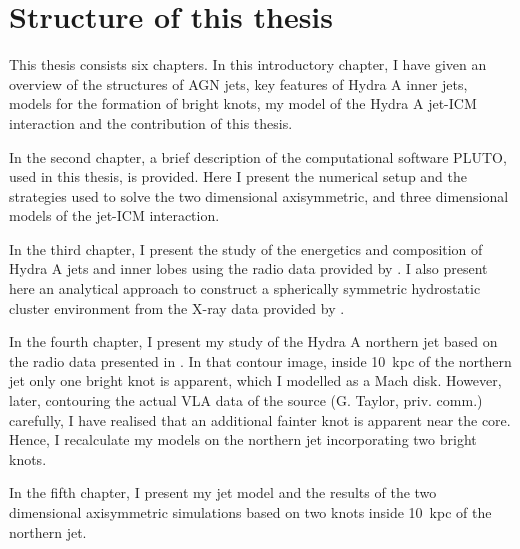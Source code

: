 %
%

\section{Structure of this thesis}
This thesis consists six chapters. In this introductory chapter, I have given an overview of the structures of AGN jets, key features of Hydra A inner jets, models for the formation of bright knots, my model of the Hydra A jet-ICM interaction and the contribution of this thesis.

In the second chapter, a brief description of the computational software PLUTO, used in this thesis, is provided. Here I present the numerical setup and the strategies used to solve the two dimensional axisymmetric, and three dimensional models  of the jet-ICM interaction.

In the third chapter, I present the study of the energetics and composition of Hydra A jets and inner lobes using the radio data provided by \citet{taylor90}. I also present here an analytical approach to construct a spherically symmetric hydrostatic cluster environment from the X-ray data provided by \citet{david01}. 

In the fourth chapter, I present my study of the Hydra A northern jet based on the radio data presented in \citet{taylor90}. In that contour image, inside 10~kpc of the northern jet only one bright knot is apparent, which I modelled as a Mach disk. However, later, contouring the actual VLA data of the source (G. Taylor, priv. comm.) carefully, I have realised that an additional fainter knot is apparent near the core. Hence, I recalculate my models on the northern jet incorporating two bright knots. 

In the fifth chapter, I present my jet model and the results of the two dimensional axisymmetric simulations based on two knots inside 10~kpc of the northern jet.  

